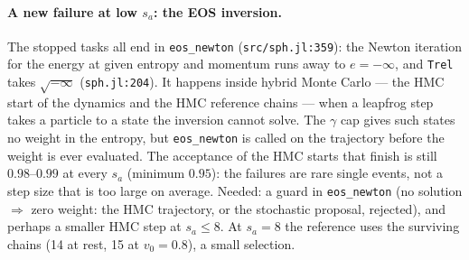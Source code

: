 \documentclass[11pt,aps,preprint,nofootinbib,superscriptaddress,tightenlines]{revtex4-2}
\let\oldparagraph\paragraph
\renewcommand{\paragraph}{\par\bigskip\oldparagraph}
\begin{document}
\paragraph{A new failure at low $s_a$: the EOS inversion.}  The stopped tasks all end in \texttt{eos\_newton} (\texttt{src/sph.jl:359}): the Newton
iteration for the energy at given entropy and momentum runs away to $e=-\infty$, and \texttt{Trel} takes $\sqrt{-\infty}$ (\texttt{sph.jl:204}).  It
happens inside hybrid Monte Carlo --- the HMC start of the dynamics and the HMC reference chains --- when a leapfrog step takes a particle to a
state the inversion cannot solve.  The $\gamma$ cap gives such states no weight in the entropy, but \texttt{eos\_newton} is called on the
trajectory before the weight is ever evaluated.  The acceptance of the HMC starts that finish is still $0.98$--$0.99$ at every $s_a$ (minimum $0.95$):
the failures are rare single events, not a step size that is too large on average.  Needed: a guard in \texttt{eos\_newton} (no solution $\Rightarrow$
zero weight: the HMC trajectory, or the stochastic proposal, rejected), and perhaps a smaller HMC step at $s_a\le8$.  At $s_a=8$ the reference uses the
surviving chains (14 at rest, 15 at $v_0=0.8$), a small selection.
\end{document}
